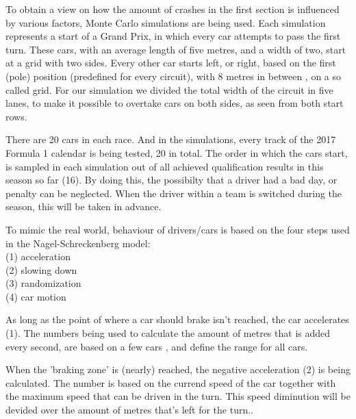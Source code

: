 To obtain a view on how the amount of crashes in the first section is influenced by various factors, Monte Carlo simulations are being used. Each simulation represents a start of a Grand Prix, in which every car attempts to pass the first turn. These cars, with an average length of five metres, and a width of two, start at a grid with two sides. Every other car starts left, or right, based on the first (pole) position (predefined for every circuit), with 8 metres in between \cite{car-regulations}, on a so called grid. For our simulation we divided the total width of the circuit in five lanes, to make it possible to overtake cars on both sides, as seen from both start rows.

There are 20 cars in each race. And in the simulations, every track of the 2017 Formula 1 calendar is being tested, 20 in total. The order in which the cars start, is sampled in each simulation out of all achieved qualification results in this season so far (16). By doing this, the possibilty that a driver had a bad day, or penalty can be neglected. When the driver within a team is switched during the season, this will be taken in advance.

To mimic the real world, behaviour of drivers/cars is based on the four steps used in the Nagel-Schreckenberg model:\\

\noindent
(1) acceleration\\
(2) slowing down\\
(3) randomization\\
(4) car motion

\smallskip
As long as the point of where a car should brake isn't reached, the car accelerates (1). The numbers being used to calculate the amount of metres that is added every second, are based on a few cars \cite{som}, and define the range for all cars.

When the 'braking zone' is (nearly) reached, the negative acceleration (2) is being calculated. The number is based on the currend speed of the car together with the maximum speed that can be driven in the turn. This speed diminution will be devided over the amount of metres that's left for the turn.\cite{som}.

